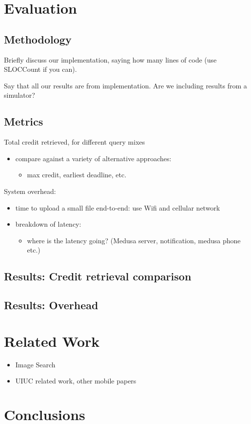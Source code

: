 \documentclass[10pt]{article}
\begin{document}
\section{Evaluation}
\label{sec-4}
\subsection{Methodology}
\label{sec-4-1}


Briefly discuss our implementation, saying how many lines of code (use
SLOCCount if you can).

Say that all our results are from implementation. Are we including
results from a simulator?
\subsection{Metrics}
\label{sec-4-2}

Total credit retrieved, for different query mixes
\begin{itemize}
\item compare against a variety of alternative approaches:
\begin{itemize}
\item max credit, earliest deadline, etc.
\end{itemize}
\end{itemize}

System overhead:
\begin{itemize}
\item time to upload a small file end-to-end: use Wifi and cellular network
\item breakdown of latency:
\begin{itemize}
\item where is the latency going? (Medusa server, notification, medusa
      phone etc.)
\end{itemize}
\end{itemize}
\subsection{Results: Credit retrieval comparison}
\label{sec-4-3}
\subsection{Results: Overhead}
\label{sec-4-4}
\section{Related Work}
\label{sec-5}


\begin{itemize}
\item Image Search
\item UIUC related work, other mobile papers
\end{itemize}
\section{Conclusions}
\label{sec-6}
\end{document}
